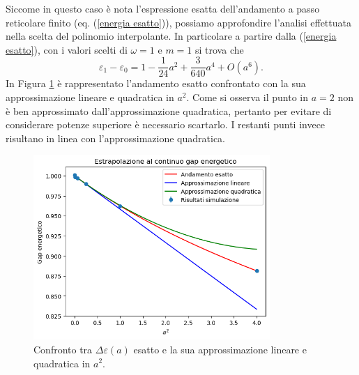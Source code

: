 \documentclass{article}
\begin{document}
Siccome in questo caso è nota l'espressione esatta dell'andamento a passo reticolare finito (eq. (\ref{energia esatto})), possiamo approfondire l'analisi effettuata nella scelta del polinomio interpolante. In particolare a partire dalla (\ref{energia esatto}), con i valori scelti di $\omega=1$ e $m=1$ si trova che 
\begin{equation}
    \label{espansione errore energia}
    \varepsilon_1-\varepsilon_0=1-\frac{1}{24}a^2+\frac{3}{640}a^4+O(a^6).
\end{equation}
In Figura \ref{grafico quadratico quartico} è rappresentato l'andamento esatto confrontato con la sua approssimazione lineare e quadratica in $a^2$. Come si osserva il punto in $a=2$ non è ben approssimato dall'approssimazione quadratica, pertanto per evitare di considerare potenze superiore è necessario scartarlo. I restanti punti invece risultano in linea con l'approssimazione quadratica.
\begin{figure}[h]
    \centering
    \includegraphics[width=0.8\textwidth]{images/deltaE_esatto_vs_quad_vs_quart.png}
    \caption{Confronto tra $\Delta\varepsilon(a)$ esatto e la sua approssimazione lineare e quadratica in $a^2$.}
    \label{grafico quadratico quartico}
\end{figure}
\end{document}
